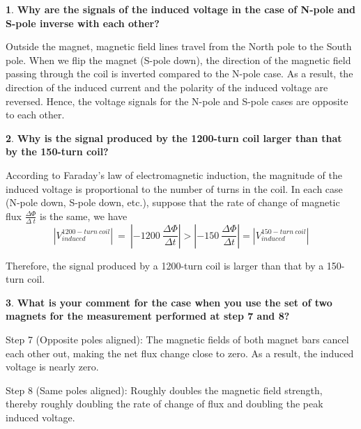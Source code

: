 \documentclass[12pt,oneside,a4paper]{article}
\theoremstyle{definition}
\newtheorem{bt}{}
\begin{document}
	\begin{bt}
		\textbf{Why are the signals of the induced voltage in the case of N-pole and S-pole inverse with each other?}
		
		Outside the magnet, magnetic field lines travel from the North pole to the South pole. When we flip the magnet (S-pole down), the direction of the magnetic field passing through the coil is inverted compared to the N-pole case. As a result, the direction of the induced current and the polarity of the induced voltage are reversed. Hence, the voltage signals for the N-pole and S-pole cases are opposite to each other.
	\end{bt}
	
	\begin{bt}
		\textbf{Why is the signal produced by the 1200-turn coil larger than that by the 150-turn coil?}
		
	According to Faraday's law of electromagnetic induction, the magnitude of the induced voltage is proportional to the number of turns in the coil.
	In each case (N-pole down, S-pole down, etc.), suppose that the rate of change of magnetic flux  $\frac{\Delta\Phi}{\Delta\ t}$  is the same, we have
	\begin{equation}
		\left|V_{induced}^{1200-turn\ coil}\right|\ =\ \left|-1200\ \frac{\Delta\Phi}{\Delta t}\right|>\left|-150\ \frac{\Delta\Phi}{\Delta t}\right|=\left|V_{induced}^{150-turn\ coil}\right|
	\end{equation}
	
	Therefore, the signal produced by a 1200-turn coil is larger than that by a 150-turn coil.

	\end{bt}
	
	\begin{bt}
		\textbf{What is your comment for the case when you use the set of two magnets for the measurement performed at step 7 and 8?}
		
		 Step 7 (Opposite poles aligned): The magnetic fields of both magnet bars cancel each other out, making the net flux change close to zero. As a result, the induced voltage is nearly zero.
		
		Step 8 (Same poles aligned): Roughly doubles the magnetic field strength, thereby roughly doubling the rate of change of flux and doubling the peak induced voltage.
		
	\end{bt}
	
\end{document}
